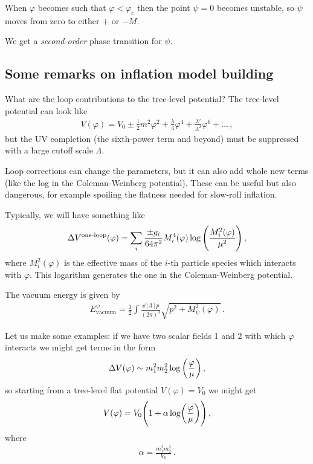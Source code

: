 \documentclass[main.tex]{subfiles}
\begin{document}
When \(\varphi \) becomes such that \(\varphi < \varphi _c\) then the point \(\psi = 0\) becomes unstable, so \(\psi \) moves from zero to either \(+\) or \(-M\).  

We get a \emph{second-order} phase transition for \(\psi \). 

\subsection{Some remarks on inflation model building}

What are the loop contributions to the tree-level potential?
The tree-level potential can look like 
%
\begin{align}
V(\varphi ) = V_0 \pm \frac{1}{2} m^2 \varphi^2 + \frac{\lambda}{4} \varphi^{4} + \frac{\lambda '}{\Lambda^2} \varphi^{6} + \dots
\,,
\end{align}
%
but the UV completion (the sixth-power term and beyond) must be suppressed with a large cutoff scale \(\Lambda \). 

Loop corrections can change the parameters, but it can also add whole new terms (like the log in the Coleman-Weinberg potential). 
These can be useful but also dangerous, for example spoiling the flatness needed for slow-roll inflation. 

Typically, we will have something like 
%
\begin{align}
\Delta V^{\text{one-loop}}(\varphi )
= \sum _{i} \frac{\pm g_i}{64 \pi^2}
M_i^{4} (\varphi ) \log \qty(\frac{M_i^2 (\varphi )}{\mu^2})
\,,
\end{align}
%
where \(M_i^2(\varphi )\) is the effective mass of the \(i\)-th particle species which interacts with \(\varphi \). 
This logarithm generates the one in the Coleman-Weinberg potential.

The vacuum energy is given by 
%
\begin{align}
E^{\psi } _{\text{vacuum}} = \frac{1}{2} \int  \frac{ \dd[3]{p}}{(2 \pi )^3}
\sqrt{p^2 + M^2_\psi (\varphi )}
\,.
\end{align}

Let us make some examples: if we have two scalar fields 1 and 2 with which \(\varphi \) interacts we might get terms in the form 
%
\begin{align}
\Delta V(\varphi ) \sim m_1^2 m_2^2 \log \qty( \frac{\varphi}{\mu })
\,,
\end{align}
%
so starting from a tree-level flat potential \(V(\varphi ) = V_0 \) we might get 
%
\begin{align}
V(\varphi ) = V_0 \qty(1 + \alpha  \log (\frac{\varphi }{\mu }))
\,,
\end{align}
%
where 
%
\begin{align}
\alpha = \frac{m_1^2 m_2^2}{V_0 }
\,.
\end{align}
%
\end{document}

